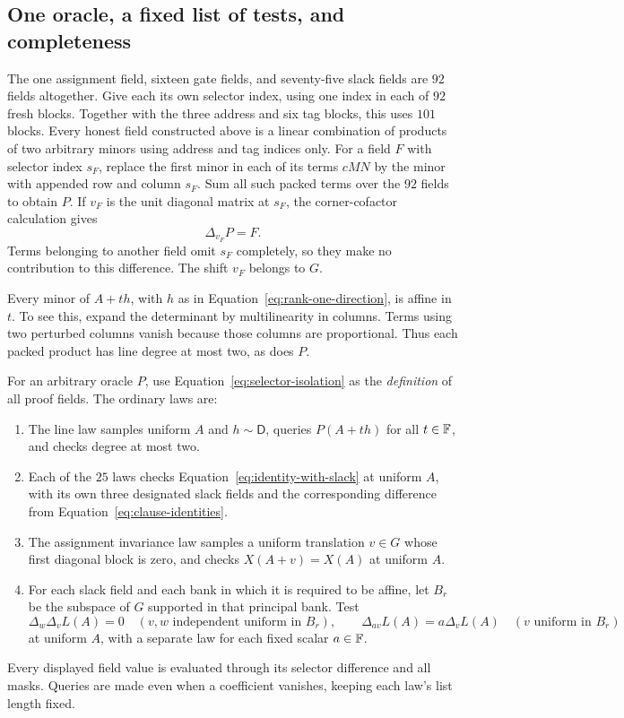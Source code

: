 \subsection{One oracle, a fixed list of tests, and completeness}

The one assignment field, sixteen gate fields, and seventy-five slack
fields are $92$ fields altogether. Give each its own selector index,
using one index in each of $92$ fresh blocks. Together with the three
address and six tag blocks, this uses $101$ blocks.
Every honest field constructed above is a linear combination of
products of two arbitrary minors using address and tag indices only.
For a field $F$ with selector index $s_F$, replace the first minor in
each of its terms $cMN$ by the minor with appended row and column
$s_F$. Sum all such packed terms over the $92$ fields to obtain $P$.
If $v_F$ is the unit diagonal matrix at $s_F$, the corner-cofactor
calculation gives
\begin{equation}\label{eq:selector-isolation}
 \Delta_{v_F}P=F.
\end{equation}
Terms belonging to another field omit $s_F$ completely, so they make
no contribution to this difference. The shift $v_F$ belongs to $G$.

Every minor of $A+th$, with $h$ as in
Equation~\ref{eq:rank-one-direction}, is affine in $t$. To see this,
expand the determinant by multilinearity in columns. Terms using two
perturbed columns vanish because those columns are proportional.
Thus each packed product has line degree at most two, as does $P$.

For an arbitrary oracle $P$, use Equation~\ref{eq:selector-isolation}
as the \emph{definition} of all proof fields. The ordinary laws are:
\begin{enumerate}
\item The line law samples uniform $A$ and $h\sim\mathsf D$, queries
$P(A+th)$ for all $t\in\mathbb F$, and checks degree at most two.
\item Each of the $25$ laws checks
Equation~\ref{eq:identity-with-slack} at uniform $A$, with its own
three designated slack fields and the corresponding difference from
Equation~\ref{eq:clause-identities}.
\item The assignment invariance law samples a uniform translation
$v\in G$ whose first diagonal block is zero, and checks
$X(A+v)=X(A)$ at uniform $A$.
\item For each slack field and each bank in which it is required to
be affine, let $B_r$ be the subspace of $G$ supported in that
principal bank. Test
\begin{equation}\label{eq:bank-tests}
 \Delta_w\Delta_vL(A)=0
 \quad(v,w\text{ independent uniform in }B_r),
 \qquad
 \Delta_{av}L(A)=a\Delta_vL(A)
 \quad(v\text{ uniform in }B_r)
\end{equation}
at uniform $A$, with a separate law for each fixed scalar $a\in\mathbb F$.
\end{enumerate}
Every displayed field value is evaluated through its selector
difference and all masks. Queries are made even when a coefficient
vanishes, keeping each law's list length fixed.

